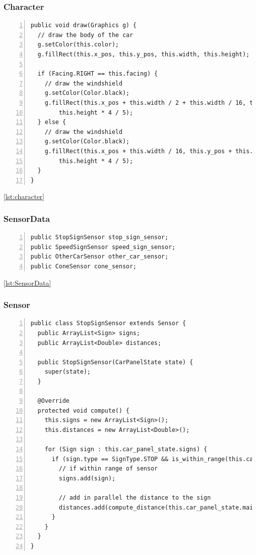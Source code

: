 \documentclass{article} %
\begin{document}
\subsubsection{Character}
\begin{lstlisting}[caption={Sample Implementation of a Character},label={lst:character},numbers=left]
public void draw(Graphics g) {
  // draw the body of the car
  g.setColor(this.color);
  g.fillRect(this.x_pos, this.y_pos, this.width, this.height);

  if (Facing.RIGHT == this.facing) {
    // draw the windshield
    g.setColor(Color.black);
    g.fillRect(this.x_pos + this.width / 2 + this.width / 16, this.y_pos + this.height / 10, this.width / 3,
        this.height * 4 / 5);
  } else {
    // draw the windshield
    g.setColor(Color.black);
    g.fillRect(this.x_pos + this.width / 16, this.y_pos + this.height / 10, this.width / 3,
        this.height * 4 / 5);
  }
}
\end{lstlisting}

\ref{lst:character}

\subsubsection{SensorData}
\begin{lstlisting}[caption={Sensor Data maintains a number of sensors},label={lst:SensorData},numbers=left]
public StopSignSensor stop_sign_sensor;
public SpeedSignSensor speed_sign_sensor;
public OtherCarSensor other_car_sensor;
public ConeSensor cone_sensor;
\end{lstlisting}

\ref{lst:SensorData}

\subsubsection{Sensor}
\begin{lstlisting}[float=*,caption={Implementation of Sensor},label={lst:sensor},numbers=left]
public class StopSignSensor extends Sensor {
  public ArrayList<Sign> signs;
  public ArrayList<Double> distances;

  public StopSignSensor(CarPanelState state) {
    super(state);
  }

  @Override
  protected void compute() {
    this.signs = new ArrayList<Sign>();
    this.distances = new ArrayList<Double>();

    for (Sign sign : this.car_panel_state.signs) {
      if (sign.type == SignType.STOP && is_within_range(this.car_panel_state.main_car, sign)) {
        // if within range of sensor
        signs.add(sign);

        // add in parallel the distance to the sign
        distances.add(compute_distance(this.car_panel_state.main_car, sign));
      }
    }
  }
}
\end{lstlisting}
\end{document}

